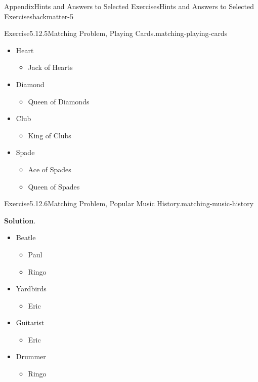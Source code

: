 \documentclass[oneside,10pt,]{book}
\newcommand{\blocktitlefont}{\relax}
\numberwithin{equation}{section}
\begin{document}
\begin{solutions-chapter}{Appendix}{Hints and Answers to Selected Exercises}{}{Hints and Answers to Selected Exercises}{}{}{backmatter-5}
\begin{divisionsolution}{Exercise}{5.12.5}{Matching Problem, Playing Cards.}{matching-playing-cards}
\begin{itemize}[label=\textbullet]
\begin{itemize}[label=$\circ$]
\item{}Jack of Hearts%
\end{itemize}
%
\item{}Heart%
\begin{itemize}[label=$\circ$]
\item{}Jack of Hearts%
\end{itemize}
%
\item{}Diamond%
\begin{itemize}[label=$\circ$]
\item{}Queen of Diamonds%
\end{itemize}
%
\item{}Club%
\begin{itemize}[label=$\circ$]
\item{}King of Clubs%
\end{itemize}
%
\item{}Spade%
\begin{itemize}[label=$\circ$]
\item{}Ace of Spades%
\item{}Queen of Spades%
\end{itemize}
%
\end{itemize}
%
\end{divisionsolution}%
\begin{divisionsolution}{Exercise}{5.12.6}{Matching Problem, Popular Music History.}{matching-music-history}%
\par\smallskip%
\noindent\textbf{\blocktitlefont Solution}.\hypertarget{matching-music-history-4-back}{}\quad{}%
\begin{itemize}[label=\textbullet]
\item{}Beatle%
\begin{itemize}[label=$\circ$]
\item{}Paul%
\item{}Ringo%
\end{itemize}
%
\item{}Yardbirds%
\begin{itemize}[label=$\circ$]
\item{}Eric%
\end{itemize}
%
\item{}Guitarist%
\begin{itemize}[label=$\circ$]
\item{}Eric%
\end{itemize}
%
\item{}Drummer%
\begin{itemize}[label=$\circ$]
\item{}Ringo%

\end{itemize}
\end{itemize}
\end{divisionsolution}
\end{solutions-chapter}
\end{document}

